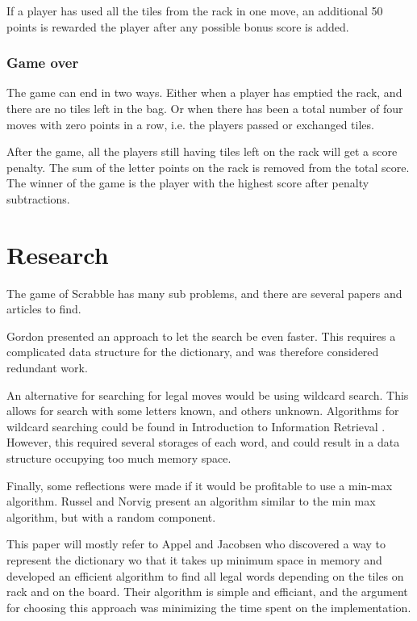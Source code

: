 \documentclass[a4paper, 12pt]{report}
\begin{document}
If a player has used all the tiles from the rack in one move, an additional 50 points is rewarded the player after any possible bonus score is added.

\subsubsection{Game over}
The game can end in two ways. Either when a player has emptied the rack, and there are no tiles left in the bag. Or when there has been a total number of four moves with zero points in a row, i.e. the players passed or exchanged tiles.

After the game, all the players still having tiles left on the rack will get a score penalty. The sum of the letter points on the rack is removed from the total score. The winner of the game is the player with the highest score after penalty subtractions. 

\section{Research}
The game of Scrabble has many sub problems, and there are several papers and articles to find.

Gordon\cite{faster} presented an approach to let the search be even faster. This requires a complicated data structure for the dictionary, and was therefore considered redundant work. 

An alternative for searching for legal moves would be using wildcard search. This allows for search with some letters known, and others unknown. Algorithms for wildcard searching could be found in Introduction to Information Retrieval \cite{inforetrieve}. However, this required several storages of each word, and could result in a data structure occupying too much memory space.

Finally, some reflections were made if it would be profitable to use a min-max algorithm. Russel and Norvig\cite{ai} present an algorithm similar to the min max algorithm, but with a random component. 

This paper will mostly refer to Appel and Jacobsen \cite{fastest} who discovered a way to represent the dictionary wo that it takes up minimum space in memory and developed an efficient algorithm to find all legal words depending on the tiles on rack and on the board. Their algorithm is simple and efficiant, and the argument for choosing this approach was minimizing the time spent on the implementation.
\end{document}
